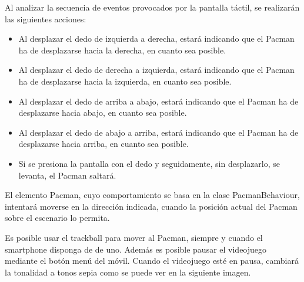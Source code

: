 Al analizar la secuencia de eventos provocados por la pantalla táctil, se realizarán las siguientes acciones:
\begin{itemize}
\item Al desplazar el dedo de izquierda a derecha, estará indicando que el Pacman ha de desplazarse hacia la derecha, en cuanto sea posible. 
\item Al desplazar el dedo de derecha a izquierda, estará indicando que el Pacman ha de desplazarse hacia la izquierda, en cuanto sea posible.
\item Al desplazar el dedo de arriba a abajo, estará indicando que el Pacman ha de desplazarse hacia abajo, en cuanto sea posible.
\item Al desplazar el dedo de abajo a arriba, estará indicando que el Pacman ha de desplazarse hacia arriba, en cuanto sea posible.
\item Si se presiona la pantalla con el dedo y seguidamente, sin desplazarlo, se levanta, el Pacman saltará.
\end{itemize}

El elemento Pacman, cuyo comportamiento se basa en la clase PacmanBehaviour, intentará moverse en la dirección indicada, cuando la posición actual del Pacman sobre el escenario lo permita.
\newline

Es posible usar el trackball para mover al Pacman, siempre y cuando el smartphone disponga de de uno. Además es posible pausar el videojuego mediante el botón menú del móvil. Cuando el videojuego esté en pausa, cambiará la tonalidad a tonos sepia como se puede ver en la siguiente imagen.

\begin{figure}[h]
	\centering	
\end{figure}


